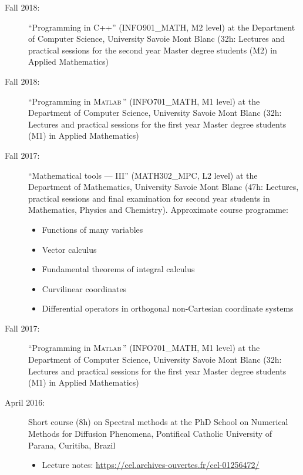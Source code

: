 \documentclass[final, a4paper, oneside, 12pt]{article}
\numberwithin{equation}{section}
\begin{document}
\begin{description}
  \item[Fall 2018:] ``Programming in C++'' (INFO901\_MATH, M2 level) at the Department of Computer Science, University Savoie Mont Blanc (32h: Lectures and practical sessions for the second year Master degree students (M2) in Applied Mathematics)

  \item[Fall 2018:] ``Programming in \textsc{Matlab}\texttrademark\,'' (INFO701\_MATH, M1 level) at the Department of Computer Science, University Savoie Mont Blanc (32h: Lectures and practical sessions for the first year Master degree students (M1) in Applied Mathematics)

  \item[Fall 2017:] ``Mathematical tools --- III'' (MATH302\_MPC, L2 level) at the Department of Mathematics, University Savoie Mont Blanc (47h: Lectures, practical sessions and final examination for second year students in Mathematics, Physics and Chemistry). Approximate course programme:
  \begin{itemize}
    \item Functions of many variables
    \item Vector calculus
    \item Fundamental theorems of integral calculus
    \item Curvilinear coordinates
    \item Differential operators in orthogonal non-Cartesian coordinate systems
  \end{itemize}
  
  \item[Fall 2017:] ``Programming in \textsc{Matlab}\texttrademark\,'' (INFO701\_MATH, M1 level) at the Department of Computer Science, University Savoie Mont Blanc (32h: Lectures and practical sessions for the first year Master degree students (M1) in Applied Mathematics)

  \item[April 2016:] Short course (8h) on Spectral methods at the PhD School on Numerical Methods for Diffusion Phenomena, Pontifical Catholic University of Parana, Curitiba, Brazil
  \begin{itemize}
    \item Lecture notes: \url{https://cel.archives-ouvertes.fr/cel-01256472/}
  \end{itemize}


\end{description}
\end{document}
